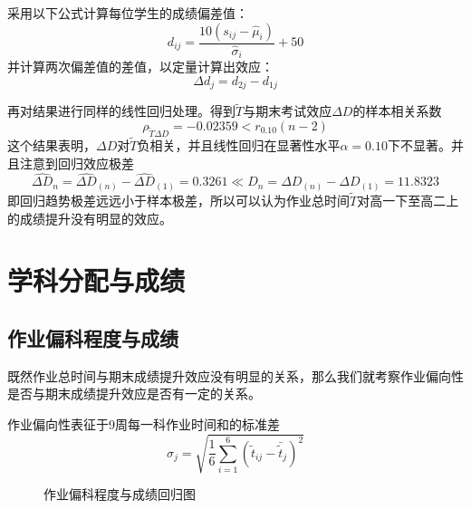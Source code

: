 \documentclass{article}
\begin{document}
\begin{CJK}{UTF8}{song}
采用以下公式计算每位学生的成绩偏差值：%
\begin{equation}
  d_{ij}=\frac{10(s_{ij}-\hat{\mu}_i)}{\hat{\sigma}_i}+50
\end{equation}
并计算两次偏差值的差值，以定量计算出效应：
\begin{equation}
  \Delta d_j=d_{2j}-d_{1j}
\end{equation}

再对结果进行同样的线性回归处理。得到$\tilde{T}$与期末考试效应$\Delta D$的样本相关系数
\begin{equation}
  \rho_{\tilde{T}\Delta D}=-0.02359<r_{0.10}(n-2)
\end{equation}
这个结果表明，$\Delta D$对$\tilde{T}$负相关，并且线性回归在显著性水平$\alpha=0.10$下不显著。并且注意到回归效应极差
\begin{equation}
  \widehat{\Delta D}_n=\widehat{\Delta D}_{(n)}-\widehat{\Delta D}_{(1)}= 0.3261 \ll D_n=\Delta D_{(n)}-\Delta D_{(1)}=11.8323
\end{equation}
即回归趋势极差远远小于样本极差，所以可以认为作业总时间$\tilde{T}$对高一下至高二上的成绩提升没有明显的效应。


\section{学科分配与成绩}
\subsection{作业偏科程度与成绩}
既然作业总时间与期末成绩提升效应没有明显的关系，那么我们就考察作业偏向性是否与期末成绩提升效应是否有一定的关系。

作业偏向性表征于9周每一科作业时间和的标准差
\begin{equation}
  \sigma_j = \sqrt{\frac{1}{6} \sum_{i=1}^{6} \left( \tilde{t}_{ij} - \bar{\tilde{t}}_j \right)^2}
\end{equation}


\begin{figure}
\caption{作业偏科程度与成绩回归图}
\begin{multicols}{2}


\end{multicols}
\end{figure}
\end{CJK}
\end{document}
